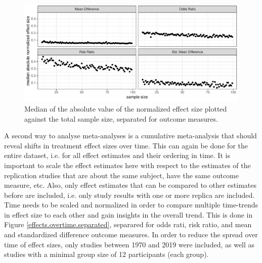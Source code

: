 \documentclass[11pt,a4paper,twoside]{book}\usepackage[]{graphicx}\usepackage[]{color}
\newenvironment{knitrout}{}{} %
\begin{document}
\begin{figure}
\begin{knitrout}
\color{fgcolor}

{\centering \includegraphics[width=\textwidth-3cm]{figure/ch02_figunnamed-chunk-23-1} 

}



\end{knitrout}
\caption{Median of the absolute value of the normalized effect size plotted against the total sample size, separated for outcome measures.}
\label{effect.samplesize.separated}
\end{figure}

A second way to analyse meta-analyses is a cumulative meta-analysis that should reveal shifts in treatment effect sizes over time. This can again be done for the entire dataset, i.e. for all effect estimates and their ordering in time. It is important to scale the effect estimates here with respect to the estimates of the replication studies that are about the same subject, have the same outcome measure, etc. Also, only effect estimates that can be compared to other estimates before are included, i.e. only study results with one or more replica are included. Time needs to be scaled and normalized in order to compare multiple time-trends in effect size to each other and gain insights in the overall trend. This is done in Figure \ref{effects.overtime.separated}, separared for odds rati, risk ratio, and mean and standardized difference outcome measures. In order to reduce the spread over time of effect sizes, only studies between 1970 and 2019 were included, as well as studies with a minimal group size of 12 participants (each group).
\end{document}
